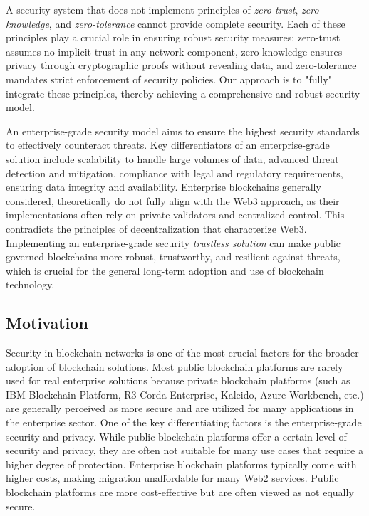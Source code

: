 A security system that does not implement principles of \textit{zero-trust}, \textit{zero-knowledge}, and \textit{zero-tolerance} cannot provide complete security. Each of these principles play a crucial role in ensuring robust security measures: zero-trust assumes no implicit trust in any network component, zero-knowledge ensures privacy through cryptographic proofs without revealing data, and zero-tolerance mandates strict enforcement of security policies. Our approach is to "fully" integrate these principles, thereby achieving a comprehensive and robust security model. \cite{nist_pub_zero_trust_arch}

An enterprise-grade security model aims to ensure the highest security standards to effectively counteract threats. Key differentiators of an enterprise-grade solution include scalability to handle large volumes of data, advanced threat detection and mitigation, compliance with legal and regulatory requirements, ensuring data integrity and availability. Enterprise blockchains generally considered, theoretically do not fully align with the Web3 approach, as their implementations often rely on private validators and centralized control. This contradicts the principles of decentralization that characterize Web3. Implementing an enterprise-grade security \textit{trustless solution} can make public governed blockchains more robust, trustworthy, and resilient against threats, which is crucial for the general long-term adoption and use of blockchain technology.

\subsection{Motivation}
Security in blockchain networks is one of the most crucial factors for the broader adoption of blockchain solutions. Most public blockchain platforms are rarely used for real enterprise solutions because private blockchain platforms (such as IBM Blockchain Platform, R3 Corda Enterprise, Kaleido, Azure Workbench, etc.) are generally perceived as more secure and are utilized for many applications in the enterprise sector. One of the key differentiating factors is the enterprise-grade security and privacy. While public blockchain platforms offer a certain level of security and privacy, they are often not suitable for many use cases that require a higher degree of protection. Enterprise blockchain platforms typically come with higher costs, making migration unaffordable for many Web2 services. Public blockchain platforms are more cost-effective but are often viewed as not equally secure.

